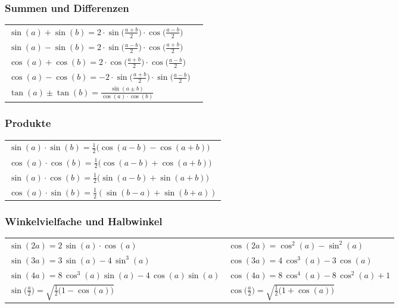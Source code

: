 \subsubsection{Summen und Differenzen}

\begin{tabular}{ll}
    $\sin(a) + \sin(b) = 2 \cdot \sin \Big( \frac{a+b}{2} \Big) \cdot \cos \Big( \frac{a-b}{2} \Big)$   \\
    $\sin(a) - \sin(b) = 2 \cdot \sin \Big( \frac{a-b}{2} \Big) \cdot \cos \Big( \frac{a+b}{2} \Big)$   \\
    $\cos(a) + \cos(b) = 2 \cdot \cos \Big( \frac{a+b}{2} \Big) \cdot \cos \Big( \frac{a-b}{2} \Big)$   \\
    $\cos(a) - \cos(b) = -2 \cdot \sin \Big( \frac{a+b}{2} \Big) \cdot \sin \Big( \frac{a-b}{2} \Big)$  \\
    $\tan(a) \pm \tan(b) = \frac{\sin(a \pm b)}{\cos(a) \cdot \cos(b)}$ 
\end{tabular}


\subsubsection{Produkte}

\begin{tabular}{l}
    $\sin(a) \cdot \sin(b) = \frac{1}{2} \big( \cos(a-b) - \cos(a+b) \big) $ \\
    $\cos(a) \cdot \cos(b) = \frac{1}{2} \big( \cos(a-b) + \cos(a+b) \big) $ \\	
    $\sin(a) \cdot \cos(b) = \frac{1}{2} \big( \sin(a-b) + \sin(a+b) \big) $ \\
    $\cos(a) \cdot \sin(b) = \frac{1}{2} \left( \sin(b - a) + \sin(b + a) \right)$
\end{tabular}


\subsubsection{Winkelvielfache und Halbwinkel}

\begin{tabular}{ll}
    $\sin(2a) = 2 \, \sin(a) \cdot \cos(a)$                                 & $\cos(2a) = \cos^2(a) - \sin^2(a)$ \\
    $\sin(3a) = 3 \, \sin(a) -4 \, \sin^3(a)$                               & $\cos(3a) = 4 \, \cos^3(a) -3 \, \cos(a)$\\ \medskip
    $\sin(4a) = 8 \, \cos^3(a) \sin(a) - 4 \, \cos(a) \sin(a)$              & $\cos(4a) = 8 \, \cos^4(a) - 8 \, \cos^2(a) + 1$\\
    $\sin \Big( \frac{a}{2} \Big) = \sqrt{\frac{1}{2} \big(1-\cos(a) \big)}$& $\cos \Big( \frac{a}{2} \Big) = \sqrt{\frac{1}{2} \big(1+\cos(a) \big)}$
\end{tabular}


